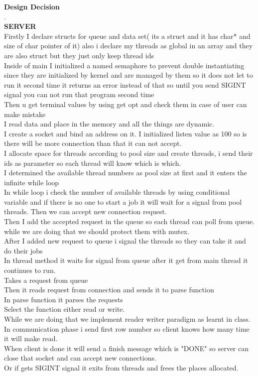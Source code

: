 \documentclass{report}
\begin{document}
{\huge \textbf{Design Decision} \\ \large .\\\large  \textbf{SERVER}\\
    Firstly I declare structs for queue and data set( its a struct and it has char* and size of char pointer of it) also i declare my threads as  global in an array and they are also struct but they just only keep thread ids\\ Inside of main I initialized a named semaphore to prevent double instantiating since they are initialized by kernel and are managed by them so it does not let to run it second time it returns an error instead of that so until you send SIGINT signal you can not run that program second time\\ Then u get terminal values by using get opt and check them in case of user can make mistake\\I read data and place in the memory and all the things are dynamic.\\I create a socket and bind an address on it. I initialized listen value as 100 so is there will be more connection than that it can not accept.\\I allocate space for threads according to pool size  and create threads, i send their ids as parameter so each thread will know which is which.\\ I determined the available thread numbers as pool size at first and it enters the infinite while loop\\ In while loop i check the number of available threads by using conditional variable and if there is no one to start a job it will wait for a signal from pool threads. Then we can accept new connection request.\\ Then I add the accepted request in the queue so each thread can poll from queue. while we are doing that we should protect them with mutex.\\After I added new request to queue i signal the threads so they can take it and do their jobs\\
    In thread method it waits for signal from queue after it get from main thread it continues to run.\\Takes a request from queue\\Then it reads request from connection and sends it to parse function\\In parse function it parses the requests\\ Select the function either read or write.\\ While we are doing that we implement reader writer paradigm as learnt in class.\\In communication phase i send first row number so client knows how many time it will make read.\\When client is done it will send a finish message which is "DONE" so server can close that socket and can accept new connections.\\Or if gets SIGINT signal it exits from threads and frees the places allocated.
}
\end{document}
